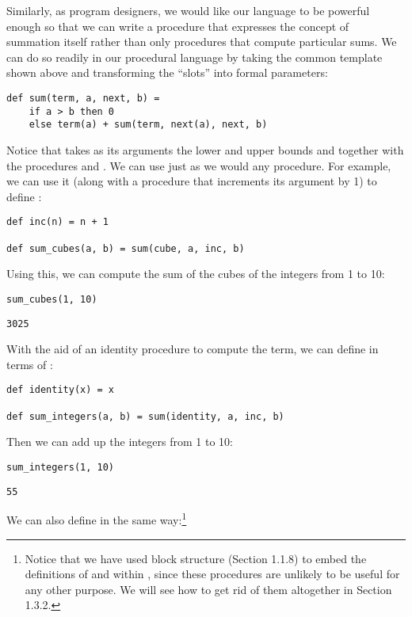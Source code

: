 Similarly, as program designers, we would like our language to be powerful enough so that we can write a procedure that expresses the concept of summation itself rather than only procedures that compute particular sums. We can do so readily in our procedural language by taking the common template shown above and transforming the ``slots'' into formal parameters:

\begin{lstlisting}[style=slate]
def sum(term, a, next, b) =
    if a > b then 0
    else term(a) + sum(term, next(a), next, b)
\end{lstlisting}

Notice that  takes as its arguments the lower and upper bounds  and  together with the procedures  and . We can use  just as we would any procedure. For example, we can use it (along with a procedure  that increments its argument by 1) to define :

\begin{lstlisting}[style=slate]
def inc(n) = n + 1

def sum_cubes(a, b) = sum(cube, a, inc, b)
\end{lstlisting}

Using this, we can compute the sum of the cubes of the integers from 1 to 10:

\begin{lstlisting}[style=slate]
sum_cubes(1, 10)
\end{lstlisting}
\begin{verbatim}
3025
\end{verbatim}

With the aid of an identity procedure to compute the term, we can define  in terms of :

\begin{lstlisting}[style=slate]
def identity(x) = x

def sum_integers(a, b) = sum(identity, a, inc, b)
\end{lstlisting}

Then we can add up the integers from 1 to 10:

\begin{lstlisting}[style=slate]
sum_integers(1, 10)
\end{lstlisting}
\begin{verbatim}
55
\end{verbatim}

We can also define  in the same way:\footnote{Notice that we have used block structure (Section 1.1.8) to embed the definitions of  and  within , since these procedures are unlikely to be useful for any other purpose. We will see how to get rid of them altogether in Section 1.3.2.}

